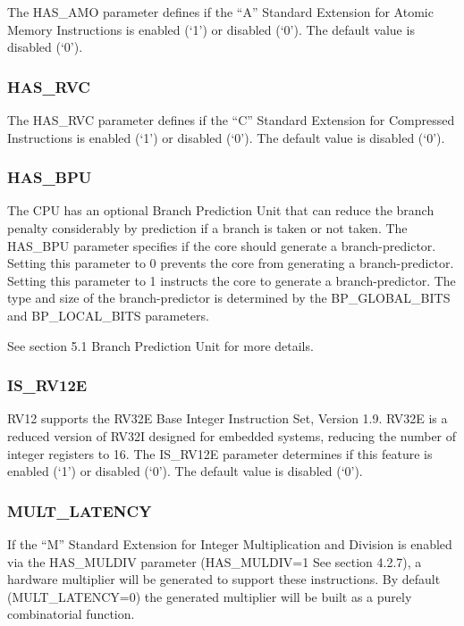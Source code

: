 The HAS\_AMO parameter defines if the ``A'' Standard Extension for
Atomic Memory Instructions is enabled (`1') or disabled (`0'). The
default value is disabled (`0').

\subsubsection{HAS\_RVC}\label{has_rvc}

The HAS\_RVC parameter defines if the ``C'' Standard Extension for
Compressed Instructions is enabled (`1') or disabled (`0'). The default
value is disabled (`0').

\subsubsection{HAS\_BPU}\label{has_bpu}

The CPU has an optional Branch Prediction Unit that can reduce the
branch penalty considerably by prediction if a branch is taken or not
taken. The HAS\_BPU parameter specifies if the core should generate a
branch-predictor. Setting this parameter to 0 prevents the core from
generating a branch-predictor. Setting this parameter to 1 instructs the
core to generate a branch-predictor. The type and size of the
branch-predictor is determined by the BP\_GLOBAL\_BITS and
BP\_LOCAL\_BITS parameters.

See section 5.1 Branch Prediction Unit for more details.

\subsubsection{IS\_RV12E}\label{is_rv12e}

RV12 supports the RV32E Base Integer Instruction Set, Version 1.9. RV32E
is a reduced version of RV32I designed for embedded systems, reducing
the number of integer registers to 16. The IS\_RV12E parameter
determines if this feature is enabled (`1') or disabled (`0'). The
default value is disabled (`0').

\subsubsection{MULT\_LATENCY}\label{mult_latency}

If the ``M'' Standard Extension for Integer Multiplication and Division
is enabled via the HAS\_MULDIV parameter (HAS\_MULDIV=1 See section
4.2.7), a hardware multiplier will be generated to support these
instructions. By default (MULT\_LATENCY=0) the generated multiplier will
be built as a purely combinatorial function.

